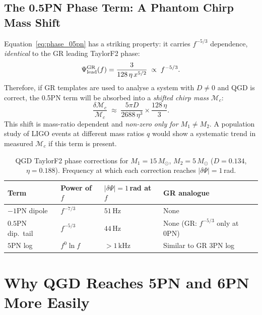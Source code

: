 \documentclass[11pt,a4paper]{article}
\newcommand{\Ms}{M_\odot}
\theoremstyle{definition}
\theoremstyle{remark}
\begin{document}
	\subsection{The 0.5PN Phase Term: A Phantom Chirp Mass Shift}
	
	Equation~\eqref{eq:phase_05pn} has a striking property: it carries
	$f^{-5/3}$ dependence, \emph{identical} to the GR leading TaylorF2 phase:
	\begin{equation}
		\Psi^{\rm GR}_{\rm lead}(f)
		= \frac{3}{128\,\eta\,x^{5/2}}
		\;\propto\; f^{-5/3}.
	\end{equation}
	Therefore, if GR templates are used to analyse a system with
	$D\neq0$ and QGD is correct, the 0.5PN term will be absorbed into
	a \emph{shifted chirp mass} $\mathcal{M}_c$:
	\begin{equation}
		\frac{\delta\mathcal{M}_c}{\mathcal{M}_c}
		\;\approx\;
		\frac{5\pi D}{2688\,\eta^3}
		\times\frac{128\,\eta}{3}.
		\label{eq:chirp_shift}
	\end{equation}
	This shift is mass-ratio dependent and \emph{non-zero only for
		$M_1\neq M_2$}.  A population study of LIGO events at different
	mass ratios $q$ would show a systematic trend in measured
	$\mathcal{M}_c$ if this term is present.
	
	\begin{table}[ht]
		\centering
		\caption{QGD TaylorF2 phase corrections for $M_1=15\,\Ms$, $M_2=5\,\Ms$
			($D=0.134$, $\eta=0.188$).  Frequency at which each correction
			reaches $|\delta\Psi|=1$\,rad.}
		\label{tab:phase}
		\renewcommand{\arraystretch}{1.3}
		\begin{tabular}{llll}
			\toprule
			Term & Power of $f$ & $|\delta\Psi|=1$\,rad at $f$ & GR analogue \\
			\midrule
			$-1$PN dipole        & $f^{-7/3}$ & $51\,\mathrm{Hz}$ & None \\
			$0.5$PN dip.\ tail   & $f^{-5/3}$ & $44\,\mathrm{Hz}$ & None (GR: $f^{-5/3}$ only at 0PN) \\
			$5$PN log            & $f^0\ln f$ & $>1\,\mathrm{kHz}$ & Similar to GR 3PN log \\
			\bottomrule
		\end{tabular}
	\end{table}
	
	\section{Why QGD Reaches 5PN and 6PN More Easily}
	\label{sec:why}
	
\end{document}
